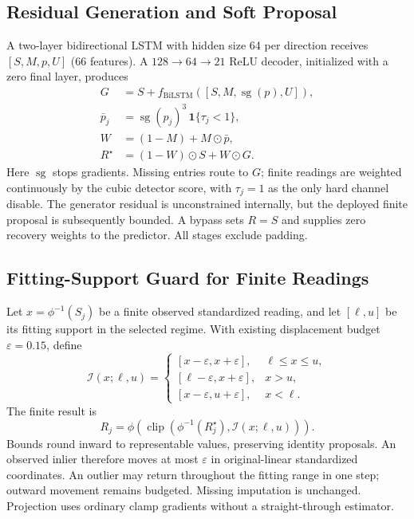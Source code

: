 \documentclass[conference]{IEEEtran}
\begin{document}
\subsection{\textbf{Residual Generation and Soft Proposal}}
A two-layer bidirectional LSTM with hidden size 64 per direction receives $[S,M,p,U]$ (66 features). A $128\rightarrow64\rightarrow21$ ReLU decoder, initialized with a zero final layer, produces
\begin{align}
 G&=S+f_{\mathrm{BiLSTM}}([S,M,\operatorname{sg}(p),U]),\\
 \bar p_j&=\operatorname{sg}(p_j)^{3}\,\mathbf{1}\{\tau_j<1\},\\
 W&=(1-M)+M\odot\bar p,\\
 R^\star&=(1-W)\odot S+W\odot G.
 \label{eq:recovery}
\end{align}
Here $\operatorname{sg}$ stops gradients. Missing entries route to $G$; finite readings are weighted continuously by the cubic detector score, with $\tau_j=1$ as the only hard channel disable. The generator residual is unconstrained internally, but the deployed finite proposal is subsequently bounded. A bypass sets $R=S$ and supplies zero recovery weights to the predictor. All stages exclude padding.

\subsection{\textbf{Fitting-Support Guard for Finite Readings}}
Let $x=\phi^{-1}(S_j)$ be a finite observed standardized reading, and let $[\ell,u]$ be its fitting support in the selected regime. With existing displacement budget $\varepsilon=0.15$, define
\begin{equation}
 \mathcal{I}(x;\ell,u)=
 \begin{cases}
 [x-\varepsilon,x+\varepsilon],&\ell\leq x\leq u,\\
 [\ell-\varepsilon,x+\varepsilon],&x>u,\\
 [x-\varepsilon,u+\varepsilon],&x<\ell.
 \end{cases}
 \label{eq:support_interval}
\end{equation}
The finite result is
\begin{equation}
 R_j=\phi\!\left(\operatorname{clip}
   (\phi^{-1}(R_j^\star),\mathcal{I}(x;\ell,u))\right).
 \label{eq:support_projection}
\end{equation}
Bounds round inward to representable values, preserving identity proposals. An observed inlier therefore moves at most $\varepsilon$ in original-linear standardized coordinates. An outlier may return throughout the fitting range in one step; outward movement remains budgeted. Missing imputation is unchanged. Projection uses ordinary clamp gradients without a straight-through estimator.
\end{document}
